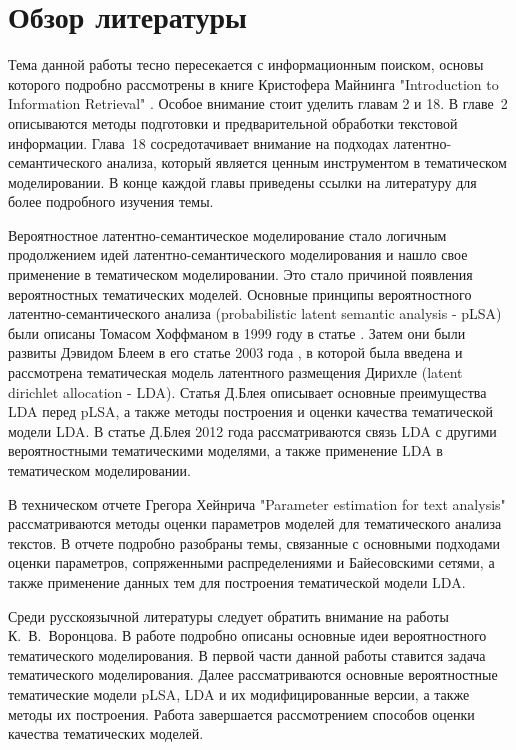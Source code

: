 \documentclass[a4paper]{report}
\begin{document}
	\section{Обзор литературы}
	
	Тема данной работы тесно пересекается с информационным поиском, основы которого подробно рассмотрены в книге Кристофера Майнинга "Introduction to Information Retrieval" \cite{bib:InformationRetrieval}. Особое внимание стоит уделить главам 2 и 18. В главе~2 описываются методы подготовки и предварительной обработки текстовой информации. Глава~18 сосредотачивает внимание на подходах латентно-семантического анализа, который является ценным инструментом в тематическом моделировании. В конце каждой главы приведены ссылки на литературу для более подробного изучения темы. 
	
	Вероятностное латентно-семантическое моделирование стало логичным продолжением идей латентно-семантического моделирования и нашло свое применение в тематическом моделировании. Это стало причиной появления вероятностных тематических моделей. Основные принципы вероятностного латентно-семантического анализа (probabilistic latent semantic analysis - pLSA) были описаны Томасом Хоффманом в 1999 году в статье \cite{bib:Hoffman}. Затем они были развиты Дэвидом Блеем в его статье 2003 года \cite{bib:Blei}, в которой была введена и рассмотрена тематическая модель латентного размещения Дирихле (latent dirichlet allocation - LDA). Статья Д.Блея описывает основные преимущества LDA перед pLSA, а также методы построения и оценки качества тематической модели LDA. В статье Д.Блея 2012 года \cite{bib:Blei2} рассматриваются связь LDA с другими вероятностными тематическими моделями, а также применение LDA в тематическом моделировании.
	
	В техническом отчете Грегора Хейнрича "Parameter estimation for text analysis" \cite{bib:Heinrich}  рассматриваются методы оценки параметров моделей для тематического анализа текстов. В отчете подробно разобраны темы, связанные с основными подходами оценки параметров, сопряженными распределениями и Байесовскими сетями, а также применение данных тем для построения тематической модели LDA. 
	
	 Среди русскоязычной литературы следует обратить внимание на работы К.~В.~Воронцова.  В работе \cite{bib:Voron1} подробно описаны основные идеи вероятностного тематического моделирования. В первой части данной работы ставится задача тематического моделирования. Далее рассматриваются основные вероятностные тематические модели pLSA, LDA и их модифицированные версии, а также методы их построения. Работа завершается рассмотрением способов оценки качества тематических моделей.
	
\end{document}
